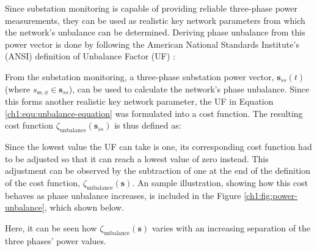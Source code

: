 
Since substation monitoring is capable of providing reliable three-phase power measurements, they can be used as realistic key network parameters from which the network's unbalance can be determined.
Deriving phase unbalance from this power vector is done by following the American National Standards Institute's (ANSI) definition of Unbalance Factor (UF) \cite{ANSI-MB-1-2011}:




From the substation monitoring, a three-phase substation power vector, $\textbf{s}_{ss}(t)$ (where $s_{\text{ss},\phi} \in \textbf{s}_{ss}$), can be used to calculate the network's phase unbalance.
Since this forms another realistic key network parameter, the UF in Equation \ref{ch1:equ:unbalance-equation} was formulated into a cost function.
The resulting cost function $\zeta_\text{unbalance}(\textbf{s}_{ss})$ is thus defined as:



Since the lowest value the UF can take is one, its corresponding cost function had to be adjusted so that it can reach a lowest value of zero instead.
This adjustment can be observed by the subtraction of one at the end of the definition of the cost function, $\zeta_\text{unbalance}(\textbf{s})$.
An sample illustration, showing how this cost behaves as phase unbalance increases, is included in the Figure \ref{ch1:fig:power-unbalance}, which shown below.



Here, it can be seen how $\zeta_\text{unbalance}(\textbf{s})$ varies with an increasing separation of the three phases' power values.


